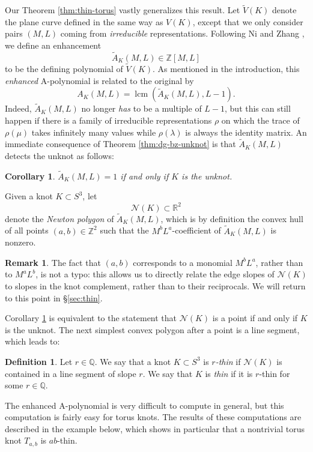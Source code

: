 \documentclass[11pt]{amsart}
\newtheorem {corollary}[theorem]{Corollary}
\numberwithin{equation}{section}
\numberwithin{theorem}{section}
\theoremstyle{definition}
\newtheorem{definition}[theorem]{Definition}
\newtheorem{remark}[theorem]{Remark}
\newcommand{\Z}{\mathbb{Z}}
\newcommand{\R}{\mathbb{R}}
\newcommand{\Q}{\mathbb{Q}}
\newcommand{\cN}{\mathcal{N}}
\begin{document}
Our Theorem \ref{thm:thin-torus} vastly generalizes this result. Let $\tilde{V}(K)$ denote the plane curve defined in the same way as $V(K)$, except that we only consider pairs $(M,L)$ coming from \emph{irreducible} representations. Following Ni and Zhang \cite{ni-zhang}, we define an enhancement
\[ \tilde{A}_K(M,L)  \in \Z[M,L] \]
to be the defining polynomial of $\tilde{V}(K)$. As mentioned in the introduction, this \emph{enhanced} A-polynomial is related to the original by
\[A_K(M,L) = \operatorname{lcm}(\tilde{A}_K(M,L), L-1). \]
Indeed, $\tilde{A}_K(M,L)$ no longer \emph{has} to be a multiple of $L-1$, but this can still happen if there is a family of irreducible representations $\rho$ on which the trace of $\rho(\mu)$ takes infinitely many values while $\rho(\lambda)$ is always the identity matrix. An immediate consequence of Theorem \ref{thm:dg-bz-unknot} is that $\tilde{A}_K(M,L)$ detects the unknot as follows:

\begin{corollary} \label{cor:Atildeunknot}
 $\tilde{A}_K(M,L) = 1$ if and only if $K$ is the unknot.
\end{corollary}

Given a knot $K \subset S^3$, let \[\cN(K) \subset \R^2\] denote the \emph{Newton polygon} of $\tilde{A}_K(M,L)$, which is by definition the convex hull of all points $(a,b) \in \Z^2$ such that the $M^bL^a$-coefficient of $\tilde{A}_K(M,L)$ is nonzero. 
\begin{remark}
The fact that $(a,b)$ corresponds to a monomial $M^bL^a$, rather than to $M^aL^b$, is not a typo: this allows us to directly relate the edge slopes of $\cN(K)$ to slopes in the knot complement, rather than to their reciprocals. We will return to this point in \S\ref{sec:thin}.
\end{remark}

Corollary \ref{cor:Atildeunknot} is equivalent to the statement that $\cN(K)$ is a point if and only if $K$ is the unknot. The next simplest convex polygon after a point is a line segment, which leads to:

\begin{definition}
Let $r\in\Q$.  We say that a  knot $K \subset S^3$ is \emph{$r$-thin} if $\cN(K)$ is contained in a line segment of slope $r$. We say that $K$ is \emph{thin} if it is $r$-thin for some $r\in \Q$.
\end{definition}

The enhanced A-polynomial is very difficult to compute in general, but this computation is fairly easy for torus knots. The results of these computations are described in the example below, which shows in particular that a nontrivial torus knot $T_{a,b}$ is $ab$-thin.
\end{document}
